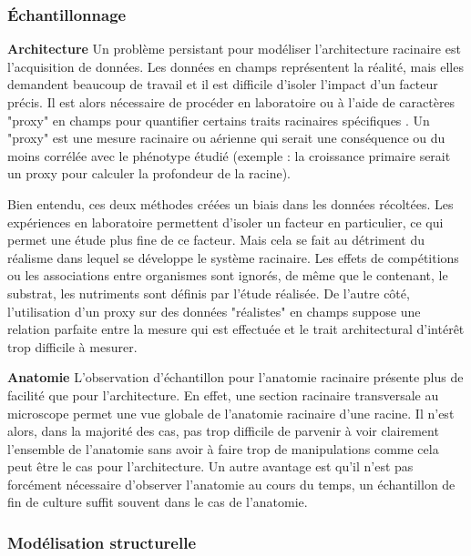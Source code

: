 \subsubsection{Échantillonnage}
\textbf{Architecture}
\newline
Un problème persistant pour modéliser l'architecture racinaire est l'acquisition de données.
Les données en champs représentent la réalité, mais elles demandent beaucoup de travail et il est difficile d'isoler l'impact d'un facteur précis.
Il est alors nécessaire de procéder en laboratoire ou à l'aide de caractères "proxy" en champs pour quantifier certains traits racinaires spécifiques \citep{wasson_traits_2012}.
Un "proxy" est une mesure racinaire ou aérienne qui serait une conséquence ou du moins corrélée avec le phénotype étudié (exemple : la croissance primaire serait un proxy pour calculer la profondeur de la racine).
\newline

Bien entendu, ces deux méthodes créées un biais dans les données récoltées.
Les expériences en laboratoire permettent d'isoler un facteur en particulier, ce qui permet une étude plus fine de ce facteur.
Mais cela se fait au détriment du réalisme dans lequel se développe le système racinaire.
Les effets de compétitions ou les associations entre organismes sont ignorés, de même que le contenant, le substrat, les nutriments sont définis par l'étude réalisée.
De l'autre côté, l'utilisation d'un proxy sur des données "réalistes" en champs suppose une relation parfaite entre la mesure qui est effectuée et le trait architectural d'intérêt trop difficile à mesurer.
\newline

\textbf{Anatomie}
\newline
L'observation d'échantillon pour l'anatomie racinaire présente plus de facilité que pour l'architecture.
En effet, une section racinaire transversale au microscope permet une vue globale de l'anatomie racinaire d'une racine.
Il n'est alors, dans la majorité des cas, pas trop difficile de parvenir à voir clairement l'ensemble de l'anatomie sans avoir à faire trop de manipulations comme cela peut être le cas pour l'architecture.
Un autre avantage est qu'il n'est pas forcément nécessaire d'observer l'anatomie au cours du temps, un échantillon de fin de culture suffit souvent dans le cas de l'anatomie.

\subsubsection{Modélisation structurelle}

